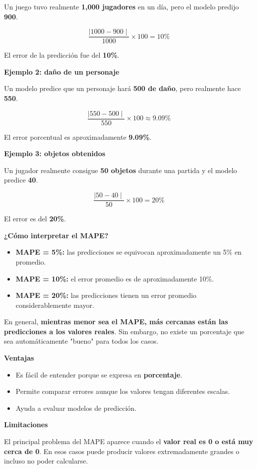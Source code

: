 \documentclass[]{article}
\begin{document}
Un juego tuvo realmente \textbf{1,000 jugadores} en un día, pero el
modelo predijo \textbf{900}.

\[\frac{\mid 1000 - 900 \mid}{1000} \times 100 = 10\%\]

El error de la predicción fue del \textbf{10\%}.

\textbf{Ejemplo 2: daño de un personaje}

Un modelo predice que un personaje hará \textbf{500 de daño}, pero
realmente hace \textbf{550}.

\[\frac{\mid 550 - 500 \mid}{550} \times 100 \approx 9.09\%\]

El error porcentual es aproximadamente \textbf{9.09\%}.

\textbf{Ejemplo 3: objetos obtenidos}

Un jugador realmente consigue \textbf{50 objetos} durante una partida y
el modelo predice \textbf{40}.

\[\frac{\mid 50 - 40 \mid}{50} \times 100 = 20\%\]

El error es del \textbf{20\%}.

\textbf{¿Cómo interpretar el MAPE?}

\begin{itemize}
\item
  \textbf{MAPE = 5\%:} las predicciones se equivocan aproximadamente un
  5\% en promedio.
\item
  \textbf{MAPE = 10\%:} el error promedio es de aproximadamente 10\%.
\item
  \textbf{MAPE = 20\%:} las predicciones tienen un error promedio
  considerablemente mayor.
\end{itemize}

En general, \textbf{mientras menor sea el MAPE, más cercanas están las
predicciones a los valores reales}. Sin embargo, no existe un porcentaje
que sea automáticamente "bueno" para todos los casos.

\textbf{Ventajas}

\begin{itemize}
\item
  Es fácil de entender porque se expresa en \textbf{porcentaje}.
\item
  Permite comparar errores aunque los valores tengan diferentes escalas.
\item
  Ayuda a evaluar modelos de predicción.
\end{itemize}

\textbf{Limitaciones}

El principal problema del MAPE aparece cuando el \textbf{valor real es 0
o está muy cerca de 0}. En esos casos puede producir valores
extremadamente grandes o incluso no poder calcularse.
\end{document}
